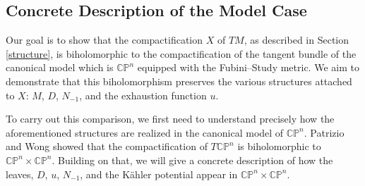 \documentclass[a4paper, 12pt]{article}
\newcommand{\bCP}{\mathbb{CP}^n}
\newcommand{\tCP}{\mathbb{CP}^n\times\mathbb{CP}^n}
\begin{document}
\subsection{Concrete Description of the Model Case}\label{Model}
Our goal is to show that the compactification $X$ of $TM$, as described in Section \ref{structure}, is biholomorphic to the compactification of the tangent bundle of the canonical model which is $\bCP$ equipped with the Fubini--Study metric. We aim to demonstrate that this biholomorphism preserves the various structures attached to $X$: $M$, $D$, $N_{-1}$, and the exhaustion function $u$. 

To carry out this comparison, we first need to understand precisely how the aforementioned structures are realized in the canonical model of $\bCP$. Patrizio and Wong \cite{PW91} showed that the compactification of $T\bCP$ is biholomorphic to $\tCP$. Building on that, we will give a concrete description of how the leaves, $D$, $u$, $N_{-1}$, and the K\"ahler potential appear in $\tCP$.
\end{document}
